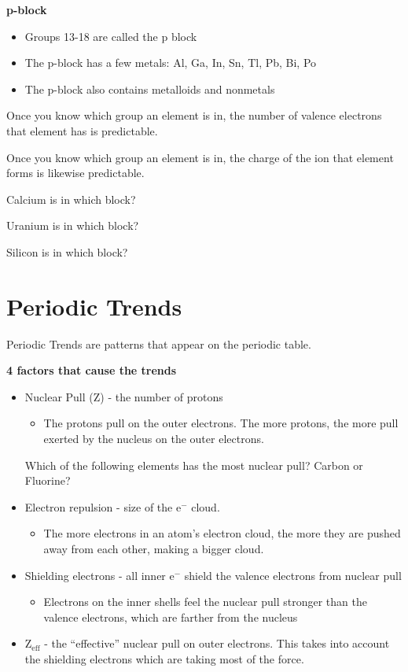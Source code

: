 \documentclass[../hchem.tex]{subfiles}
\begin{document}
\textbf{p-block}
\begin{itemize}
    \item Groups 13-18 are called the p block 
    \item The p-block has a few metals: Al, Ga, In, Sn, Tl, Pb, Bi, Po 
    \item The p-block also contains metalloids and nonmetals 
\end{itemize}

Once you know which group an element is in, the number of valence electrons that element has is predictable.

Once you know which group an element is in, the charge of the ion that element forms is likewise predictable.

\ex Calcium is in which block?

\ex Uranium is in which block? 

\ex Silicon is in which block? 

\section{Periodic Trends}
Periodic Trends are patterns that appear on the periodic table.

\textbf{4 factors that cause the trends}
\begin{itemize}
    \item Nuclear Pull (Z) - the number of protons 
    \begin{itemize}
        \item The protons pull on the outer electrons. The more protons, the more pull exerted by the nucleus on the outer electrons.
    \end{itemize}

    \ex Which of the following elements has the most nuclear pull? Carbon or Fluorine?

    \item Electron repulsion - size of the e$^-$ cloud.
    \begin{itemize}
        \item The more electrons in an atom's electron cloud, the more they are pushed away from each other, making a bigger cloud.
    \end{itemize}

    \item Shielding electrons - all inner e$^-$ shield the valence electrons from nuclear pull 
    \begin{itemize}
        \item Electrons on the inner shells feel the nuclear pull stronger than the valence electrons, which are farther from the nucleus 
    \end{itemize}

    \item Z$_{\text{eff}}$ - the ``effective'' nuclear pull on outer electrons. This takes into account the shielding electrons which are taking most of the force.
\end{itemize}
\end{document}
